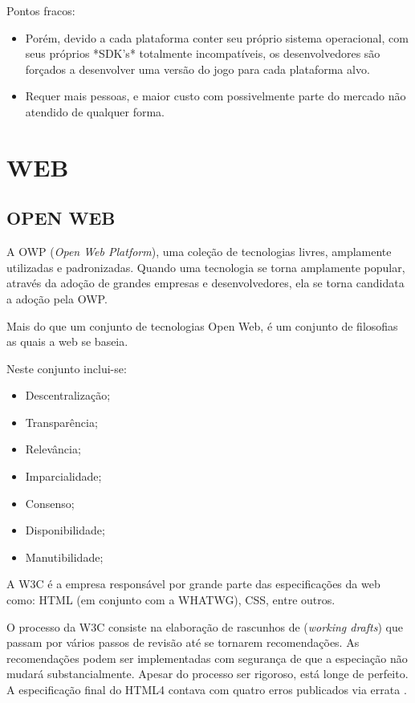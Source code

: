 Pontos fracos:
\begin{itemize}
\item Porém, devido a cada plataforma conter seu próprio sistema operacional,
com seus próprios *SDK's* totalmente incompatíveis, os desenvolvedores são
forçados a desenvolver uma versão do jogo para cada plataforma alvo.
\item Requer mais pessoas, e maior custo com possivelmente parte do
mercado não atendido de qualquer forma.
\end{itemize}

\section{WEB}

\subsection{OPEN WEB}
A OWP (\textit{Open Web Platform}), uma coleção de tecnologias livres,
amplamente utilizadas e padronizadas.
Quando uma tecnologia se torna amplamente popular, através da
adoção de grandes empresas e desenvolvedores, ela se torna candidata a
adoção pela OWP.

Mais do que um conjunto de tecnologias Open Web, é um conjunto de
filosofias as quais a web se baseia.

Neste conjunto inclui-se:

\begin{itemize}
\item Descentralização;
\item Transparência;
\item Relevância;
\item Imparcialidade;
\item Consenso;
\item Disponibilidade;
\item Manutibilidade;
\end{itemize}

A W3C é a empresa responsável por grande parte das especificações
da web como: HTML (em conjunto com a WHATWG), CSS, entre outros. 

O processo da W3C consiste na elaboração de rascunhos de
(\textit{working drafts}) que passam por vários passos de revisão
até se tornarem recomendações. As recomendações podem ser implementadas com
segurança de que a especiação não mudará substancialmente.
Apesar do processo ser rigoroso, está longe de perfeito. A
especificação final do HTML4 contava com quatro erros publicados via
errata \autocite{HTML5}.

